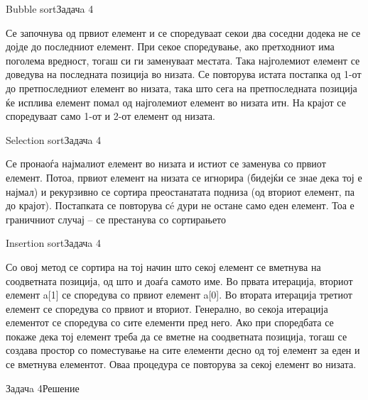 \begin{frame}[fragile]{Bubble sort}{Задачa 4}
\begin{scriptsize}
Се започнува од првиот елемент и се споредуваат секои два соседни додека не се
дојде до последниот елемент. При секое споредување, ако претходниот има поголема
вредност, тогаш си ги заменуваат местата. Така најголемиот елемент се доведува
на последната позиција во низата. Се повторува истата постапка од 1-от до
претпоследниот елемент во низата, така што сега на претпоследната позиција ќе
исплива елемент помал од најголемиот елемент во низата итн. На крајот се
споредуваат само 1-от и 2-от елемент од низата.
\end{scriptsize}

\end{frame}

\begin{frame}[fragile]{Selection sort}{Задачa 4}
\begin{scriptsize}
Се  пронаоѓа најмалиот елемент во низата и истиот се заменува со првиот елемент.
Потоа, првиот елемент на низата се игнорира (бидејќи се знае дека тој е најмал)
и рекурзивно се сортира преостанатата подниза (од вториот елемент, па до
крајот). Постапката се повторува сé дури не остане само еден елемент. Тоа е
граничниот случај – се престанува со сортирањето
\end{scriptsize}

\end{frame}

\begin{frame}[fragile]{Insertion sort}{Задачa 4}
\begin{scriptsize}
Со овој метод се сортира на тој начин што секој елемент се вметнува на
соодветната позиција, од што и доаѓа самото име. Во првата итерација, вториот
елемент a[1] се споредува со првиот елемент a[0]. Во втората итерација третиот
елемент се споредува со првиот и вториот. Генерално, во секоја итерација
елементот се споредува со сите елементи пред него. Ако при споредбата се покаже
дека тој елемент треба да се вметне на соодветната позиција, тогаш се создава
простор со поместување на сите елементи десно од тој елемент за еден и се
вметнува елементот. Оваа процедура се повторува за секој елемент во низата. 
\end{scriptsize}

\end{frame}

\begin{frame}[fragile]{Задачa 4}{Решение}

\end{frame}
